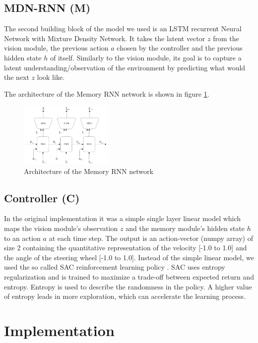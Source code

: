 \documentclass{article}
\begin{document}
\subsection{MDN-RNN (M)}
The second building block of the model we used is an LSTM\cite{lstm} recurrent Neural Network with Mixture Density Network\cite{MDN}. It takes the latent vector $z$ from the vision module, the previous action $a$ chosen by the controller and the previous hidden state $h$ of itself. Similarly to the vision module, its goal is to capture a latent understanding/observation of the environment by predicting what would the next $z$ look like.

The architecture of the Memory RNN network is shown in figure \ref{fig:rnn}.


\begin{figure}
    \centering
    \includegraphics[width=0.4\textwidth]{RNN.png}
    \caption{Architecture of the Memory RNN network}
    \label{fig:rnn}
\end{figure}

\subsection{Controller (C)}
In the original implementation it was a simple single layer linear model which maps the vision module’s observation $z$ and the memory module’s hidden state $h$ to an action $a$ at each time step. The output is an action-vector (numpy array) of size 2 containing the quantitative representation of the velocity [-1.0 to 1.0] and the angle of the steering wheel [-1.0 to 1.0].
Instead of the simple linear model, we used the so called SAC reinforcement learning policy \cite{sac}. SAC uses entropy regularization and is trained to maximize a trade-off between expected return and entropy. Entropy is used to describe the randomness in the policy. A higher value of entropy leads in more exploration, which can accelerate the learning process.

\section{Implementation}
\end{document}
